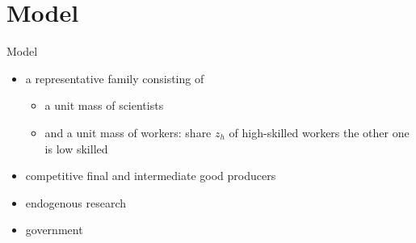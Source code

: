 \documentclass[11pt,aspectratio=169]{beamer}
\begin{document}
\section{Model}
\begin{frame}{Model}

	\vspace{-2mm}
	\begin{itemize}
		\item a representative family consisting of
		\begin{itemize}
		\item a unit mass of scientists 
		\item and a unit mass of workers: share $z_h$ of high-skilled workers the other one is low skilled
		
		\end{itemize}
		\item competitive final and intermediate good producers
		\item endogenous research
		\item government
	\end{itemize} 
\end{frame}
\end{document}
